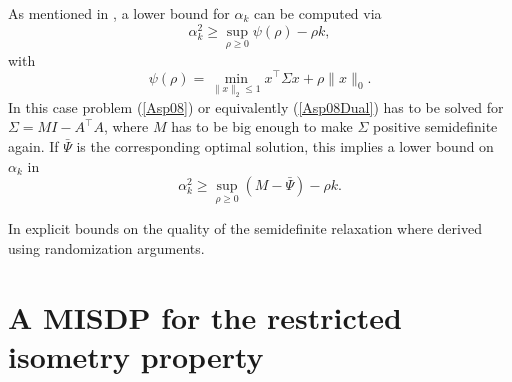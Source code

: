 \documentclass[journal]{IEEEtran}
\newcommand{\Norm}[2]{\lVert{#1}\rVert_{#2}}
\newcommand{\T}{^{\top}}
\begin{document}
As mentioned in \cite{Asp08}, a lower bound for $\alpha_k$ can be computed via
\begin{equation*}
 \alpha_k^2 \geq \sup_{\rho \geq 0} \psi(\rho) - \rho k,
\end{equation*}
with 
\begin{equation*}
 \psi(\rho) = \min_{\Norm{x}{2} \leq 1} x\T \Sigma x + \rho \Norm{x}{0}.
\end{equation*}
In this case problem (\ref{Asp08}) or equivalently (\ref{Asp08Dual}) has to be solved for $\Sigma = M I - A\T A$, where $M$ has to be big enough to make $\Sigma$ positive semidefinite again. If $\bar{\Psi}$ is the corresponding optimal solution, this implies
a lower bound on $\alpha_k$ in
\begin{equation*}
 \alpha_k^2 \geq \sup_{\rho \geq 0} (M - \bar{\Psi}) - \rho k.
\end{equation*}

In \cite{AspBG14} explicit bounds on the quality of the semidefinite relaxation where derived using randomization arguments.
 


\section{A MISDP for the restricted isometry property}
\label{sec:MISDP}
\end{document}
